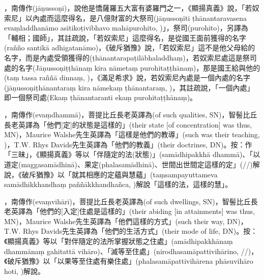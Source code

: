 \startitemgroup[noteitems]
\item{}，南傳作(jāṇussoṇi)，說他是憍薩羅五大富有婆羅門之一，《顯揚真義》說，「若奴索尼」以內處而這麼得名，是八億財富的大祭司(jāṇussoṇīti ṭhānantaravasena evaṃladdhanāmo asītikoṭivibhavo mahāpurohito, )」，祭司(purohito)，另譯為「輔相；國師」，其註疏說，「若奴索尼」這麼得名，是從國王面前獲得的名字(rañño santikā adhigatanāmo)，《破斥猶豫》說，「若奴索尼」這不是他父母給的名字，而是內處受領獲得的(ṭhānantarapaṭilābhaladdhaṃ)，若奴索尼處這是祭司處的名字(Jāṇussoṇiṭṭhānaṃ kira nāmetaṃ purohitaṭṭhānaṃ)，那是國王給與他的(taṃ tassa raññā dinnaṃ, )，《滿足希求》說，若奴索尼內處是一個內處的名字(jāṇussoṇiṭhānantaraṃ kira nāmekaṃ ṭhānantaraṃ, )，其註疏說，「一個內處」即一個祭司處(Ekaṃ ṭhānantaranti ekaṃ purohitaṭṭhānaṃ)。
\stopitemgroup

\startitemgroup[noteitems]
\item{}，南傳作(evaṃdhammā)，菩提比丘長老英譯為(of such qualities, SN)，智髻比丘長老英譯為「他們[定]的狀態是這樣的」(their state [of concentration] was thus, MN)，Maurice Walshe先生英譯為「這樣是他們的教導」(such was their teaching, )，T.W. Rhys Davids先生英譯為「他們的教義」(their doctrines, DN)。按：作「三昧」，《顯揚真義》等以「伴隨定的法(狀態)」(samādhipakkhā dhammā)、「以道定(maggasamādhinā)、果定(phalasamādhinā)、世間出世間定這樣的定」(//)解說，《破斥猶豫》以「就其相應的定蘊與慧蘊」(taṃsampayuttameva samādhikkhandhaṃ paññākkhandhañca, )解說「這樣的法，這樣的慧」。
\stopitemgroup

\startitemgroup[noteitems]
\item{}，南傳作(evaṃvihārī)，菩提比丘長老英譯為(of such dwellings, SN)，智髻比丘長老英譯為「他們的[入定]住處是這樣的」(their abiding [in attainments] was thus, MN)，Maurice Walshe先生英譯為「他們這樣的方式」(such their way, DN)，T.W. Rhys Davids先生英譯為「他們的生活方式」(their mode of life, DN)。按：《顯揚真義》等以「對伴隨定的法所掌握狀態之住處」(amādhipakkhānaṃ dhammānaṃ gahitattā vihāro)、「滅等至住處」(nirodhasamāpattivihārino, //)，《破斥猶豫》以「以果等至住處有樂住處」(phalasamāpattivihārena phāsuvihāro hoti, )解說。
\stopitemgroup

